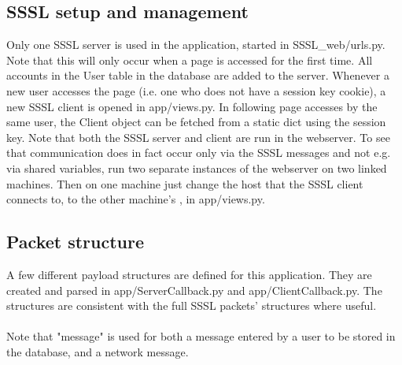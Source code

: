 \documentclass{article}
\begin{document}
\subsection{SSSL setup and management}
Only one SSSL server is used in the application, started in SSSL\_web/urls.py. Note that this will only occur when a page is accessed for the first time. All accounts in the User table in the database are added to the server. Whenever a new user accesses the page (i.e. one who does not have a session key cookie), a new SSSL client is opened in app/views.py. In following page accesses by the same user, the Client object can be fetched from a static dict using the session key. Note that both the SSSL server and client are run in the webserver. To see that communication does in fact occur only via the SSSL messages and not e.g. via shared variables, run two separate instances of the webserver on two linked machines. Then on one machine just change the host that the SSSL client connects to, to the other machine's , in app/views.py.

\subsection{Packet structure}
A few different payload structures are defined for this application. They are created and parsed in app/ServerCallback.py and app/ClientCallback.py. The structures are consistent with the full SSSL packets' structures where useful. \\ \\

Note that "message" is used for both a message entered by a user to be stored in the database, and a network message. \\ \\
\end{document}

